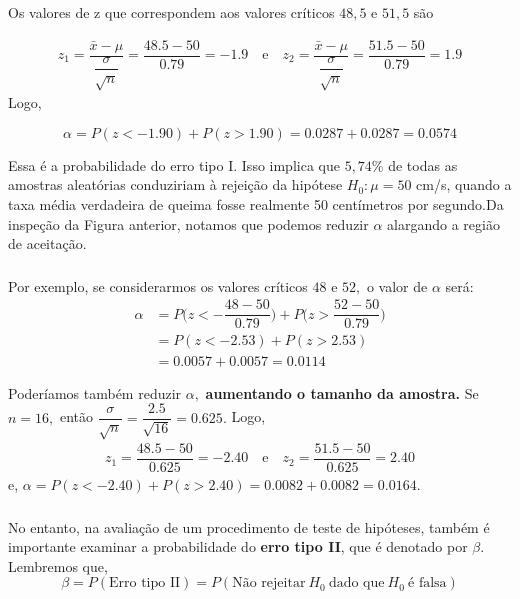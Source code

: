 \documentclass[14pt,aspectratio=1610]{beamer}
\newcommand{\bx}{\ensuremath{\bar{x}}}
\newcommand{\Ho}{\ensuremath{H_{0}}}
\begin{document}
\begin{frame}{}
\frametitle{}
\begin{block}{}
\justifying
Os valores de z que correspondem aos valores críticos $48,5$ e $51,5$ são

\begin{align*}
z_{1}=\dfrac{\bx-\mu}{\dfrac{\sigma}{\sqrt{n}}}=\dfrac{48.5-50}{0.79}=-1.9\quad \textrm{e}\quad z_{2}=\dfrac{\bx-\mu}{\dfrac{\sigma}{\sqrt{n}}}=\dfrac{51.5-50}{0.79}=1.9
\end{align*}
Logo,

$$\alpha=P(z<-1.90)+P(z>1.90)=0.0287+0.0287=0.0574$$

Essa é a probabilidade do erro tipo I. Isso implica que $5,74\%$ de todas as amostras aleatórias conduziriam à rejeição da hipótese $\Ho: \mu = 50$ cm/s, quando a 
taxa média verdadeira de queima fosse realmente 50 centímetros por segundo.Da inspeção da Figura anterior, notamos que podemos reduzir $\alpha$ alargando a 
região de aceitação.
\end{block}
\end{frame}

\begin{frame}{}
\frametitle{}
\begin{block}{}
\justifying
Por exemplo, se considerarmos os valores críticos $48$ e $52,$ o valor de $\alpha$ será:
\begin{align*}
\alpha&=P\Biggl(z<-\dfrac{48-50}{0.79}\Biggl)+P\Biggl(z>\dfrac{52-50}{0.79}\Biggl)\\
&=P(z<-2.53)+P(z>2.53)\\
&=0.0057+0.0057=0.0114
\end{align*}
\end{block}
\pause
\begin{block}{}
Poderíamos também reduzir $\alpha,$ \textbf{aumentando o tamanho da amostra.} Se $n = 16,$ então $\dfrac{\sigma}{\sqrt{n}}=\dfrac{2.5}{\sqrt{16}}=0.625.$ Logo,
\begin{align*}
z_{1}=\dfrac{48.5-50}{0.625}=-2.40\quad \textrm{e}\quad z_{2}=\dfrac{51.5-50}{0.625}=2.40
\end{align*}
e, $\alpha=P(z<-2.40)+P(z>2.40)=0.0082+0.0082=0.0164.$
\end{block}
\end{frame}

\begin{frame}{}
\frametitle{}
\begin{block}{}
\justifying
No entanto, na avaliação de um procedimento de teste de hipóteses, também é importante examinar a probabilidade do \textbf{erro tipo II}, que é denotado por $\beta.$ 
Lembremos que, $$ \beta=P(\textrm{Erro tipo II})=P(\textrm{Não rejeitar}\ \Ho\ \textrm{dado que}\ \Ho\ \textrm{é falsa})$$
\end{block}
\end{frame}
\end{document}
